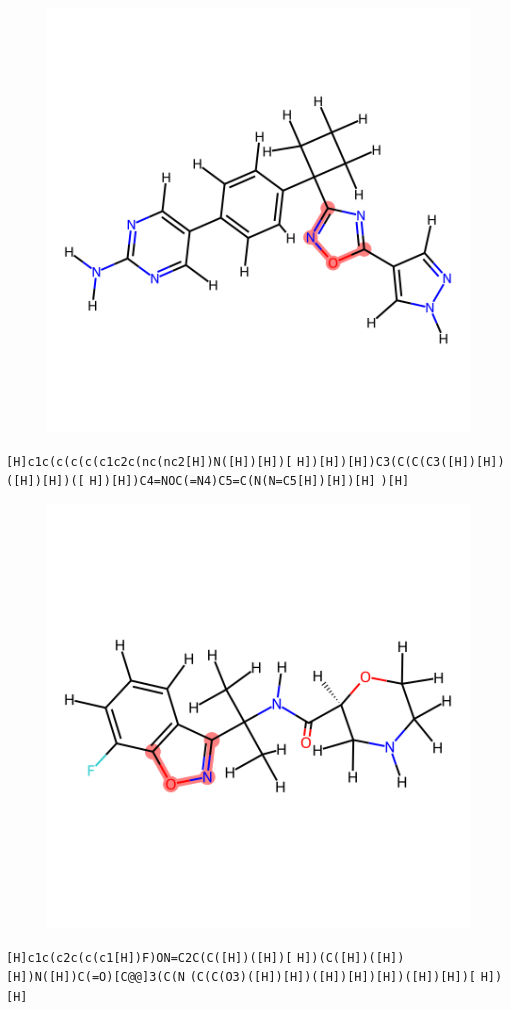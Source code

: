 \documentclass{article}
\begin{document}
\begin{figure}[ht]
\centering
    \includegraphics{mol210.png}
\end{figure}
\verb|[H]c1c(c(c(c(c1c2c(nc(nc2[H])N([H])[H])[| \verb|H])[H])[H])C3(C(C(C3([H])[H])([H])[H])([| \verb|H])[H])C4=NOC(=N4)C5=C(N(N=C5[H])[H])[H]| \verb|)[H]|

\begin{figure}[ht]
\centering
    \includegraphics{mol211.png}
\end{figure}
\verb|[H]c1c(c2c(c(c1[H])F)ON=C2C(C([H])([H])[| \verb|H])(C([H])([H])[H])N([H])C(=O)[C@@]3(C(N| \verb|(C(C(O3)([H])[H])([H])[H])[H])([H])[H])[| \verb|H])[H]|
\end{document}
